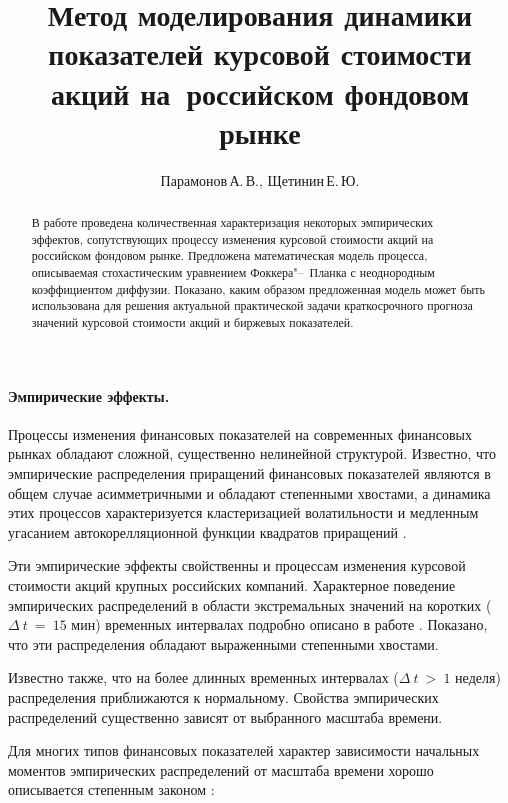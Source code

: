 \documentclass{mce-article}
\begin{document}
\title{Метод моделирования динамики показателей курсовой стоимости
  акций на~российском фондовом рынке}

\author{Парамонов\,А.\,В., Щетинин\,Е.\,Ю.}

\maketitle

\begin{abstract}
  В работе проведена количественная характеризация некоторых
  эмпирических эффектов, сопутствующих процессу изменения курсовой
  стоимости акций на российском фондовом рынке. Предложена
  математическая модель процесса, описываемая стохастическим
  уравнением Фоккера"--~Планка с неоднородным коэффициентом
  диффузии. Показано, каким образом предложенная модель может быть
  использована для решения актуальной практической задачи
  краткосрочного прогноза значений курсовой стоимости акций и биржевых
  показателей.
\end{abstract}

\paragraph{Эмпирические эффекты.}

Процессы изменения финансовых показателей на современных финансовых
рынках обладают сложной, существенно нелинейной структурой. Известно,
что эмпирические распределения приращений финансовых показателей
являются в общем случае асимметричными и обладают степенными хвостами,
а динамика этих процессов характеризуется кластеризацией волатильности
и медленным угасанием автокорелляционной функции квадратов приращений
\cite{Mantegna-Stanley, Muzy}.

Эти эмпирические эффекты свойственны и процессам изменения курсовой
стоимости акций крупных российских компаний. Характерное поведение
эмпирических распределений в области экстремальных значений на
коротких ($\Delta~t~=~\mbox{15 мин}$) временных интервалах подробно
описано в работе \cite{Schetinin:EmpiricalEffects}. Показано, что эти
распределения обладают выраженными степенными хвостами.

Известно также, что на более длинных временных интервалах
($\Delta~t~>~\mbox{1 неделя}$) распределения приближаются к
нормальному. Свойства эмпирических распределений существенно зависят
от выбранного масштаба времени.

Для многих типов финансовых показателей характер зависимости начальных
моментов эмпирических распределений от масштаба времени хорошо
описывается степенным законом \cite{Mantegna-Stanley, Muzy, Peinke}:
\end{document}
